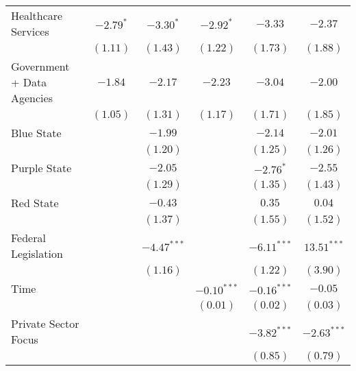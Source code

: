 \documentclass{article}
\begin{document}
\begin{table}[H]
\begin{center}
\begin{tabular}{l c c c c c}
Healthcare Services                             & $-2.79^{*}$  & $-3.30^{*}$   & $-2.92^{*}$   & $-3.33$       & $-2.37$       \\
                                                  & $(1.11)$     & $(1.43)$      & $(1.22)$      & $(1.73)$      & $(1.88)$      \\
Government + Data Agencies                      & $-1.84$      & $-2.17$       & $-2.23$       & $-3.04$       & $-2.00$       \\
                                                  & $(1.05)$     & $(1.31)$      & $(1.17)$      & $(1.71)$      & $(1.85)$      \\
Blue State                                      &              & $-1.99$       &               & $-2.14$       & $-2.01$       \\
                                                  &              & $(1.20)$      &               & $(1.25)$      & $(1.26)$      \\
Purple State                                    &              & $-2.05$       &               & $-2.76^{*}$   & $-2.55$       \\
                                                  &              & $(1.29)$      &               & $(1.35)$      & $(1.43)$      \\
Red State                                       &              & $-0.43$       &               & $0.35$        & $0.04$        \\
                                                  &              & $(1.37)$      &               & $(1.55)$      & $(1.52)$      \\
Federal Legislation                             &              & $-4.47^{***}$ &               & $-6.11^{***}$ & $13.51^{***}$ \\
                                                  &              & $(1.16)$      &               & $(1.22)$      & $(3.90)$      \\
Time                      &              &               & $-0.10^{***}$ & $-0.16^{***}$ & $-0.05$       \\
                                                  &              &               & $(0.01)$      & $(0.02)$      & $(0.03)$      \\
Private Sector Focus                            &              &               &               & $-3.82^{***}$ & $-2.63^{***}$ \\
                                                  &              &               &               & $(0.85)$      & $(0.79)$      \\

\end{tabular}
\end{center}
\end{table}
\end{document}
